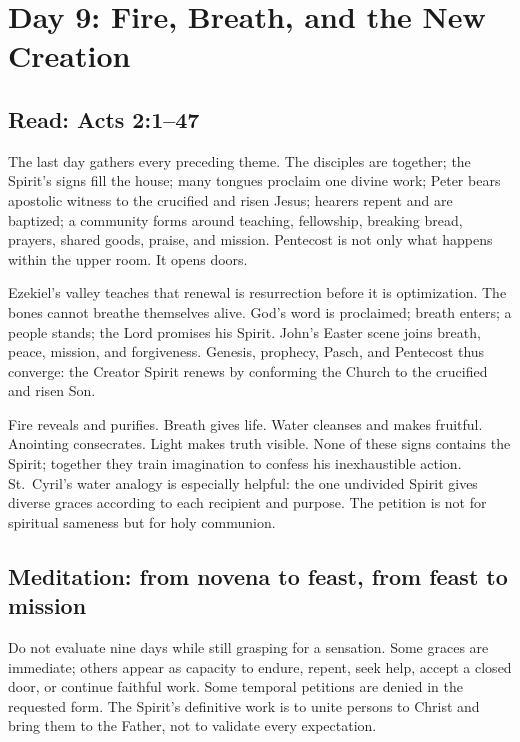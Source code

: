 \section{Day 9: Fire, Breath, and the New Creation}


\subsection{Read: Acts 2:1--47}

The last day gathers every preceding theme. The disciples are together; the Spirit's signs fill the house; many tongues proclaim one divine work; Peter bears apostolic witness to the crucified and risen Jesus; hearers repent and are baptized; a community forms around teaching, fellowship, breaking bread, prayers, shared goods, praise, and mission. Pentecost is not only what happens within the upper room. It opens doors.

Ezekiel's valley teaches that renewal is resurrection before it is optimization. The bones cannot breathe themselves alive. God's word is proclaimed; breath enters; a people stands; the Lord promises his Spirit. John's Easter scene joins breath, peace, mission, and forgiveness. Genesis, prophecy, Pasch, and Pentecost thus converge: the Creator Spirit renews by conforming the Church to the crucified and risen Son.

Fire reveals and purifies. Breath gives life. Water cleanses and makes fruitful. Anointing consecrates. Light makes truth visible. None of these signs contains the Spirit; together they train imagination to confess his inexhaustible action. St.~Cyril's water analogy is especially helpful: the one undivided Spirit gives diverse graces according to each recipient and purpose. The petition is not for spiritual sameness but for holy communion.

\subsection{Meditation: from novena to feast, from feast to mission}

Do not evaluate nine days while still grasping for a sensation. Some graces are immediate; others appear as capacity to endure, repent, seek help, accept a closed door, or continue faithful work. Some temporal petitions are denied in the requested form. The Spirit's definitive work is to unite persons to Christ and bring them to the Father, not to validate every expectation.

